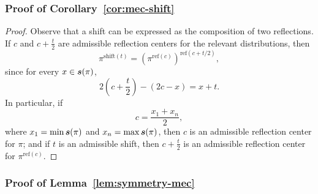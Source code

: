 \subsubsection{Proof of Corollary~\ref{cor:mec-shift}}
\label{appendix:proof-mec-shift}

\mecShift*
\begin{proof}
Observe that a shift can be expressed as the composition of two reflections.
If $c$ and $c+\tfrac{t}{2}$ are admissible reflection centers for the relevant
distributions, then
\[
\pi^{\mathrm{shift}(t)}
=
\left(\pi^{\mathrm{ref}(c)}\right)^{\mathrm{ref}(c+t/2)},
\]
since for every $x\in\boldsymbol{s}(\pi)$,
\[
2\!\left(c+\frac{t}{2}\right)-(2c-x)=x+t.
\]
In particular, if
\[
c=\frac{x_1+x_n}{2},
\]
where $x_1=\min\boldsymbol{s}(\pi)$ and $x_n=\max\boldsymbol{s}(\pi)$, then $c$ is an
admissible reflection center for $\pi$; and if $t$ is an admissible shift,
then $c+\tfrac{t}{2}$ is an admissible reflection center for
$\pi^{\mathrm{ref}(c)}$.
\end{proof}

\subsubsection{Proof of Lemma~\ref{lem:symmetry-mec}}
\label{appendix:proof-symmetry-mec}

